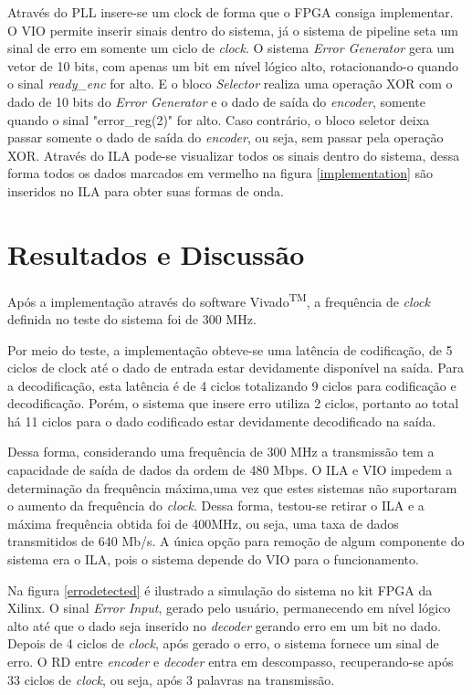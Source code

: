 \documentclass[11pt,twocolumn]{article}
\begin{document}
Através do PLL insere-se um clock de forma que o FPGA consiga implementar. O VIO permite inserir sinais dentro do sistema, já o sistema de pipeline seta um sinal de erro em somente um ciclo de \textit{clock}. O sistema \textit{Error Generator} gera um vetor de 10 bits, com apenas um bit em nível lógico alto, rotacionando-o quando o sinal \textit{ready\_enc} for alto. E o bloco \textit{Selector} realiza uma operação XOR com o dado de 10 bits do \textit{Error Generator} e o dado de saída do \textit{encoder}, somente quando o sinal "error\_reg(2)" for alto. Caso contrário, o bloco seletor deixa passar somente o dado de saída do \textit{encoder}, ou seja, sem passar pela operação XOR. Através do ILA pode-se visualizar todos os sinais dentro do sistema, dessa forma todos os dados marcados em vermelho na figura \ref{implementation} são inseridos no ILA para obter suas formas de onda.


\section{Resultados e Discussão}

Após a implementação através do software Vivado\textsuperscript{TM}, a frequência de \textit{clock} definida no teste do sistema foi de 300 MHz. 

Por meio do teste, a implementação obteve-se uma latência de codificação, de 5 ciclos de clock até o dado de entrada estar devidamente disponível na saída. Para a decodificação, esta latência é de 4 ciclos totalizando 9 ciclos para codificação e decodificação. Porém, o sistema que insere erro utiliza 2 ciclos, portanto ao total há 11 ciclos para o dado codificado estar devidamente decodificado na saída.

Dessa forma, considerando uma frequência de 300 MHz a transmissão tem a capacidade de saída de dados da ordem de 480 Mbps. O ILA e VIO impedem a determinação da frequência máxima,uma vez que estes sistemas não suportaram o aumento da frequência do \textit{clock}. Dessa forma, testou-se retirar o ILA e a máxima frequência obtida foi de 400MHz, ou seja, uma taxa de dados transmitidos de 640 Mb/s. A única opção para remoção de algum componente do sistema era o ILA, pois o sistema depende do VIO para o funcionamento.

Na figura \ref{errodetected} é ilustrado a simulação do sistema no kit FPGA da Xilinx. O sinal \textit{Error Input}, gerado pelo usuário, permanecendo em nível lógico alto até que o dado seja inserido no \textit{decoder} gerando erro em um bit no dado. Depois de 4 ciclos de \textit{clock}, após gerado o erro, o sistema fornece um sinal de erro. O RD entre \textit{encoder} e \textit{decoder} entra em descompasso, recuperando-se após 33 ciclos de \textit{clock}, ou seja, após 3 palavras na transmissão. 
\end{document}
